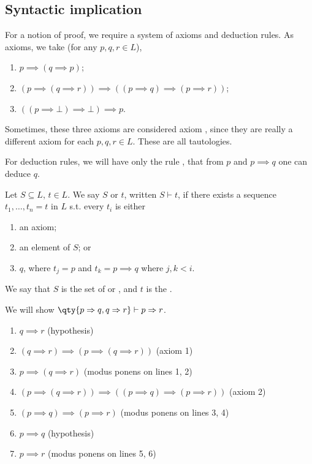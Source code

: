 \subsection{Syntactic implication}
For a notion of proof, we require a system of axioms and deduction rules.
As axioms, we take (for any $p, q, r \in L$),
\begin{enumerate}
    \item $p \implies (q \implies p)$;
    \item $(p \implies (q \implies r)) \implies ((p \implies q) \implies (p \implies r))$;
    \item $((p \implies \bot) \implies \bot) \implies p$.
\end{enumerate}
\begin{remark}
    Sometimes, these three axioms are considered axiom , since they are really a different axiom for each $p, q, r \in L$.
    These are all tautologies.
\end{remark}
For deduction rules, we will have only the rule , that from $p$ and $p \implies q$ one can deduce $q$.
\begin{definition}
    Let $S \subseteq L$, $t \in L$.
    We say $S$  or  $t$, written $S \vdash t$, if there exists a sequence $t_1, \dots, t_n = t$ in $L$ s.t. every $t_i$ is either
    \begin{enumerate}
        \item an axiom;
        \item an element of $S$; or
        \item $q$, where $t_j = p$ and $t_k = p \implies q$ where $j, k < i$.
    \end{enumerate}
    We say that $S$ is the set of  or , and $t$ is the .
\end{definition}
\begin{example}
    We will show $\qty{p \implies q, q \implies r} \vdash p \implies r$.
    \begin{enumerate}
        \item $q \implies r$ (hypothesis)
        \item $(q \implies r) \implies (p \implies (q \implies r))$ (axiom 1)
        \item $p \implies (q \implies r)$ (modus ponens on lines 1, 2)
        \item $(p \implies (q \implies r)) \implies ((p \implies q) \implies (p \implies r))$ (axiom 2)
        \item $(p \implies q) \implies (p \implies r)$ (modus ponens on lines 3, 4)
        \item $p \implies q$ (hypothesis)
        \item $p \implies r$ (modus ponens on lines 5, 6)
    \end{enumerate}
\end{example}
